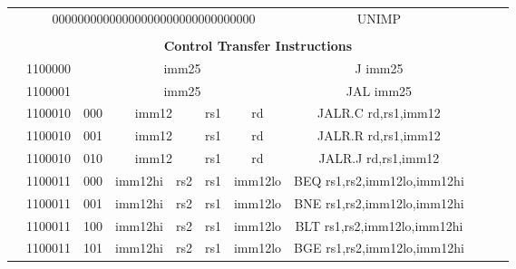 \begin{table}[p]
\begin{small}
\begin{center}
\begin{tabular}{rcccccccccccl}
&
\multicolumn{8}{|c|}{00000000000000000000000000000000} & UNIMP \\
\cline{2-9}
  

&
\multicolumn{11}{c}{} & \\
&
\multicolumn{11}{c}{\bf Control Transfer Instructions} & \\
\cline{2-9}
  

&
\multicolumn{1}{|c|}{1100000} &
\multicolumn{7}{c|}{imm25} & J imm25 \\
\cline{2-9}
  

&
\multicolumn{1}{|c|}{1100001} &
\multicolumn{7}{c|}{imm25} & JAL imm25 \\
\cline{2-9}
  

&
\multicolumn{1}{|c|}{1100010} &
\multicolumn{1}{c|}{000} &
\multicolumn{4}{c|}{imm12} &
\multicolumn{1}{c|}{rs1} &
\multicolumn{1}{c|}{rd} & JALR.C rd,rs1,imm12 \\
\cline{2-9}
  

&
\multicolumn{1}{|c|}{1100010} &
\multicolumn{1}{c|}{001} &
\multicolumn{4}{c|}{imm12} &
\multicolumn{1}{c|}{rs1} &
\multicolumn{1}{c|}{rd} & JALR.R rd,rs1,imm12 \\
\cline{2-9}
  

&
\multicolumn{1}{|c|}{1100010} &
\multicolumn{1}{c|}{010} &
\multicolumn{4}{c|}{imm12} &
\multicolumn{1}{c|}{rs1} &
\multicolumn{1}{c|}{rd} & JALR.J rd,rs1,imm12 \\
\cline{2-9}
  

&
\multicolumn{1}{|c|}{1100011} &
\multicolumn{1}{c|}{000} &
\multicolumn{3}{c|}{imm12hi} &
\multicolumn{1}{c|}{rs2} &
\multicolumn{1}{c|}{rs1} &
\multicolumn{1}{c|}{imm12lo} & BEQ rs1,rs2,imm12lo,imm12hi \\
\cline{2-9}
  

&
\multicolumn{1}{|c|}{1100011} &
\multicolumn{1}{c|}{001} &
\multicolumn{3}{c|}{imm12hi} &
\multicolumn{1}{c|}{rs2} &
\multicolumn{1}{c|}{rs1} &
\multicolumn{1}{c|}{imm12lo} & BNE rs1,rs2,imm12lo,imm12hi \\
\cline{2-9}
  

&
\multicolumn{1}{|c|}{1100011} &
\multicolumn{1}{c|}{100} &
\multicolumn{3}{c|}{imm12hi} &
\multicolumn{1}{c|}{rs2} &
\multicolumn{1}{c|}{rs1} &
\multicolumn{1}{c|}{imm12lo} & BLT rs1,rs2,imm12lo,imm12hi \\
\cline{2-9}
  

&
\multicolumn{1}{|c|}{1100011} &
\multicolumn{1}{c|}{101} &
\multicolumn{3}{c|}{imm12hi} &
\multicolumn{1}{c|}{rs2} &
\multicolumn{1}{c|}{rs1} &
\multicolumn{1}{c|}{imm12lo} & BGE rs1,rs2,imm12lo,imm12hi \\
\cline{2-9}
  


\end{tabular}
\end{center}
\end{small}
\end{table}
